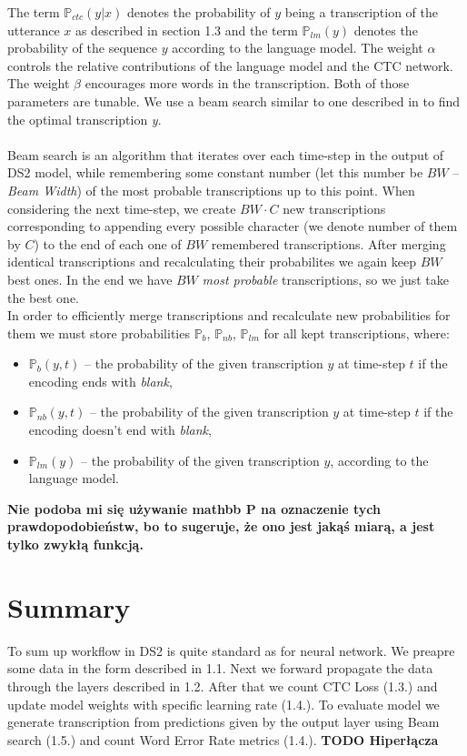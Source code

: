\documentclass[licencjacka,en]{pracamgr}
\begin{document}
The term $\mathbb{P}_{ctc}(y|x)$ denotes the probability of $y$ being a transcription of the utterance $x$ as described in section 1.3 and the term $\mathbb{P}_{lm}(y)$ denotes the probability of the sequence $y$ according to the language model. The weight $\alpha$ controls the relative contributions of the language model and the CTC network. The weight $\beta$ encourages more words in the transcription. Both of those parameters are tunable. We use a beam search similar to one described in \cite{DS7} to find the optimal transcription \textit{y}.\\\\
Beam search is an algorithm that iterates over each time-step in the output of DS2 model, while remembering some constant number (let this number be $BW$ -- \textit{Beam Width}) of the most probable transcriptions up to this point. When considering the next time-step, we create $BW \cdot C$ new transcriptions corresponding to appending every possible character (we denote number of them by $C$) to the end of each one of $BW$ remembered transcriptions. After merging identical transcriptions and recalculating their probabilites we again keep $BW$ best ones. In the end we have $BW$ \textit{most probable} transcriptions, so we just take the best one.\\
In order to efficiently merge transcriptions and recalculate new probabilities for them we must store probabilities $\mathbb{P}_{b}$, $\mathbb{P}_{nb}$, $\mathbb{P}_{lm}$ for all kept transcriptions, where:
\begin{itemize}
  \item $\mathbb{P}_{b}(y, t)$ -- the probability of the given transcription $y$ at time-step $t$ if the encoding ends with \textit{blank},
  \item $\mathbb{P}_{nb}(y, t)$ -- the probability of the given transcription $y$ at time-step $t$ if the encoding doesn't end with \textit{blank},
  \item $\mathbb{P}_{lm}(y)$ -- the probability of the given transcription $y$, according to the language model.\\
\end{itemize}
\textbf{Nie podoba mi się używanie mathbb P na oznaczenie tych prawdopodobieństw, bo to sugeruje, że ono jest jakąś miarą, a jest tylko zwykłą funkcją.}

\section{Summary}
To sum up workflow in DS2 is quite standard as for neural network. We preapre some data in the form described in 1.1. Next we forward propagate the data through the layers described in 1.2. After that we count CTC Loss (1.3.) and update model weights with specific learning rate (1.4.). To evaluate model we generate transcription from predictions given by the output layer using Beam search (1.5.) and count Word Error Rate metrics (1.4.).
\textbf{TODO Hiperłącza}
\end{document}
